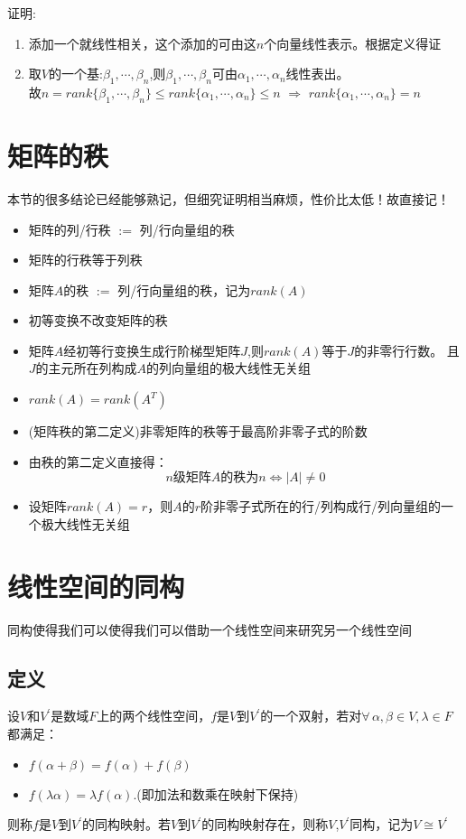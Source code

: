 证明:
\begin{enumerate}
    \item 添加一个就线性相关，这个添加的可由这$n$个向量线性表示。根据定义得证
    \item 取$V$的一个基:$\beta_1, \cdots, \beta_n$,则$\beta_1, \cdots, \beta_n$可由$\alpha_1, \cdots, \alpha_n$线性表出。\\
    故$n = rank\{\beta_1, \cdots, \beta_n\} \leq rank\{\alpha_1, \cdots, \alpha_n\} \leq n$ $\Rightarrow$ $rank\{\alpha_1, \cdots, \alpha_n\} = n$
\end{enumerate}

\section{矩阵的秩}

本节的很多结论已经能够熟记，但细究证明相当麻烦，性价比太低！故直接记！
\begin{itemize}
    \item 矩阵的列/行秩 $:=$ 列/行向量组的秩
    \item 矩阵的行秩等于列秩
    \item 矩阵$A$的秩 $:=$ 列/行向量组的秩，记为$rank(A)$
    \item 初等变换不改变矩阵的秩
    \item 矩阵$A$经初等行变换生成行阶梯型矩阵$J$,则$rank(A)$等于$J$的非零行行数。
    且$J$的主元所在列构成$A$的列向量组的极大线性无关组
    \item $rank(A) = rank(A^T)$
    \item (矩阵秩的第二定义)非零矩阵的秩等于最高阶非零子式的阶数
    \item 由秩的第二定义直接得：
        \begin{equation*}
            n \text{级矩阵} A \text{的秩为} n \Leftrightarrow |A| \neq 0
        \end{equation*} 
    \item 设矩阵$rank(A)=r$，则$A$的$r$阶非零子式所在的行/列构成行/列向量组的一个极大线性无关组
\end{itemize}

\section{线性空间的同构}
同构使得我们可以使得我们可以借助一个线性空间来研究另一个线性空间

\subsection*{定义}
\begin{definition}
    设$V$和$V^{'}$是数域$F$上的两个线性空间，$f$是$V$到$V^{'}$的一个双射，若对$\forall \, \alpha, \beta \in V, \lambda \in F$都满足：
    \begin{itemize}
        \item $f(\alpha + \beta) = f(\alpha) + f(\beta)$
        \item $f(\lambda \alpha) = \lambda f(\alpha)$.(即加法和数乘在映射下保持)
    \end{itemize}
    则称$f$是$V$到$V^{'}$的同构映射。若$V$到$V^{'}$的同构映射存在，则称$V$,$V^{'}$同构，记为$V \cong V^{'}$
\end{definition}

